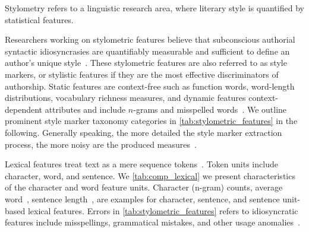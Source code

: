 
\begin{definition}
    [Stylometry]
    Stylometry refers to a linguistic research area, where literary style is quantified by statistical features.
\end{definition}
Researchers working on stylometric features believe that subconscious authorial syntactic idiosyncrasies are quantifiably measurable and sufficient to define an author's unique style~\citep{neal_surveying_2018}. 
These stylometric features are also referred to as style markers, or stylistic features if they are the most effective discriminators of authorship. 
Static features are context-free such as function words, word-length distributions, vocabulary richness measures, and dynamic features context-dependent attributes and include $n$-grams and misspelled words~\citep{abbasi_writeprints_2008}.
We outline prominent style marker taxonomy categories in \autoref{tab:stylometric_features} in the following. 
Generally speaking, the more detailed the style marker extraction process, the more noisy are the produced measures~\citep{stamatatos_survey_2009}.

Lexical features treat text as a mere sequence tokens~\citep{stamatatos_survey_2009}.
Token units include character, word, and sentence.
We \autoref{tab:comp_lexical} we present characteristics of the character and word feature units.
Character (n-gram) counts, average word~\citep{stein_intrinsic_2011}, sentence length~\citep{stein_intrinsic_2011,abbasi_writeprints_2008}, are examples for character, sentence, and sentence unit-based lexical features.
Errors in \autoref{tab:stylometric_features} refers to idiosyncratic features include misspellings, grammatical mistakes, and other usage anomalies~\citep{abbasi_writeprints_2008,neal_surveying_2018}.


